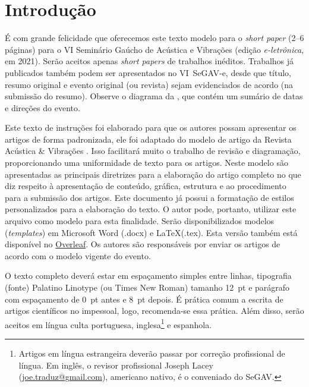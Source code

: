 \section{Introdução}

É com grande felicidade que oferecemos este texto modelo para o \textit{short paper} (2--6 páginas) para o VI Seminário Gaúcho de Acústica e Vibrações (edição \textit{e-letrônica}, em 2021). Serão aceitos apenas \textit{short papers} de trabalhos inéditos. Trabalhos já publicados também podem ser apresentados no VI~SeGAV-e, desde que título, resumo original e evento original (ou revista) sejam evidenciados de acordo (na submissão do resumo).
%
Observe o diagrama da , que contém um sumário de datas e direções do evento.

Este texto de instruções foi elaborado para que os autores possam apresentar os artigos de forma padronizada, ele foi adaptado do modelo de artigo da Revista Acústica \& Vibrações \cite{modelo}. Isso facilitará muito o trabalho de revisão e diagramação, proporcionando uma uniformidade de texto para os artigos. Neste modelo são apresentadas as principais diretrizes para a elaboração do artigo completo no que diz respeito à apresentação de conteúdo, gráfica, estrutura e ao procedimento para a submissão dos artigos.
% 
Este documento já possui a formatação de estilos personalizados para a elaboração do texto. O autor pode, portanto, utilizar este arquivo como modelo para esta finalidade. Serão disponibilizados modelos (\textit{templates}) em Microsoft Word (.docx) e \LaTeX\xspace (.tex). Esta versão também está disponível no \href{https://www.overleaf.com/read/gtxwpfrgdtgk}{Overleaf}. Os autores são responsáveis por enviar os artigos de acordo com o modelo vigente do evento.

O texto completo deverá estar em espaçamento simples entre linhas, tipografia (fonte) Palatino Linotype (ou Times New Roman) tamanho 12~pt e parágrafo com espaçamento de 0~pt antes e 8~pt depois. É prática comum a escrita de artigos científicos no impessoal, logo, recomenda-se essa prática. Além disso, serão aceitos em língua culta portuguesa, inglesa\footnote{Artigos em língua estrangeira deverão passar por correção profissional de língua. Em inglês, o revisor profissional Joseph Lacey (\href{mailto:joe.traduz@gmail.com}{joe.traduz@gmail.com}), americano nativo, é o conveniado do SeGAV.} e espanhola. 

